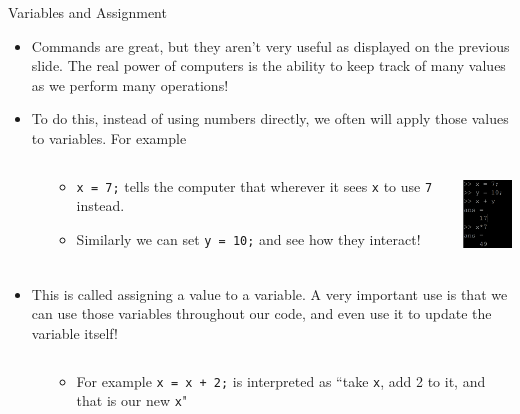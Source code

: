 {}\documentclass[letterpaper,
compress,
xcolor=x11names,
]{beamer}
\begin{document}
\begin{frame}{Variables and Assignment}
	\footnotesize
	\begin{itemize}
		\item Commands are great, but they aren't very useful as displayed on the previous slide. The real power of computers is the ability to keep track of many values as we perform many operations!
		\item To do this, instead of using numbers directly, we often will apply those values to variables. For example
		\begin{columns}
			\begin{column}{0.05\linewidth}
			\end{column}
			\begin{column}{0.65\linewidth}
				\scriptsize
				\begin{itemize}
					\item \texttt{x = 7;} tells the computer that wherever it sees \texttt{x} to use \texttt{7} instead.
					\item Similarly we can set \texttt{y = 10;} and see how they interact!
				\end{itemize}
			\end{column}
			\begin{column}{0.3\linewidth}
				\begin{center}
					\includegraphics[height = 2cm]{Variables.png}
				\end{center}
			\end{column}
		\end{columns}
		\item This is called assigning a value to a variable. A very important use is that we can use those variables throughout our code, and even use it to update the variable itself!
		\begin{columns}
			\begin{column}{0.05\linewidth}
			\end{column}
			\begin{column}{0.65\linewidth}
				\scriptsize
				\begin{itemize}
					\item For example \texttt{x = x + 2;} is interpreted as ``take \texttt{x}, add 2 to it, and that is our new \texttt{x}"

\end{itemize}
\end{column}
\end{columns}
\end{itemize}
\end{frame}
\end{document}
